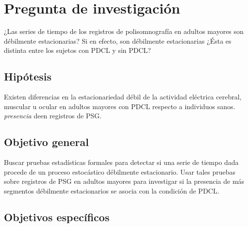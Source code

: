 
\section{Pregunta de investigación}

¿Las series de tiempo de los registros de polisomnografía en adultos mayores son débilmente estacionarias?
%
Si en efecto, son débilmente estacionarias ¿Ésta es distinta entre los sujetos con PDCL y sin PDCL?


\subsection{Hipótesis}

Existen diferencias en la estacionariedad débil de la actividad eléctrica cerebral, muscular u ocular en adultos mayores con PDCL respecto a 
individuos sanos. 
\textit{presencia} deen registros de PSG.


\subsection{Objetivo general}

Buscar pruebas estadísticas formales para detectar si una serie de tiempo dada procede de un 
proceso estocástico débilmente estacionario.
%
Usar tales pruebas sobre registros de PSG en adultos mayores para investigar si la 
presencia de más segmentos débilmente estacionarios se asocia con la condición de PDCL.


\subsection{Objetivos específicos}


